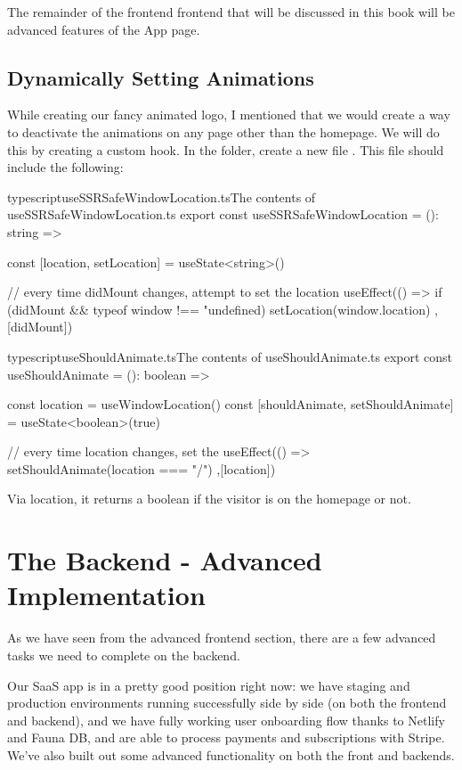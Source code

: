 \documentclass[paper=6in:9in,pagesize=pdftex,headinclude=on,footinclude=on,12pt]{scrbook}
\begin{document}
The remainder of the frontend frontend that will be discussed in this book will be advanced features of the App page. 

\section{Dynamically Setting Animations}

While creating our fancy animated logo, I mentioned that we would create a way to deactivate the animations on any page other than the homepage. We will do this by creating a custom hook. In the  folder, create a new file . This file should include the following:


\begin{codeInput}{typescript}{useSSRSafeWindowLocation.ts}{The contents of useSSRSafeWindowLocation.ts}
export const useSSRSafeWindowLocation = (): string => {
  const [location, setLocation] = useState<string>()

  // every time didMount changes, attempt to set the location
  useEffect(() => {
    if (didMount && typeof window !== "undefined) {
      setLocation(window.location)
    }
  },[didMount])
}
\end{codeInput}

\begin{codeInput}{typescript}{useShouldAnimate.ts}{The contents of useShouldAnimate.ts}
export const useShouldAnimate = (): boolean => {
  const location = useWindowLocation()
  const [shouldAnimate, setShouldAnimate] = useState<boolean>(true)

  // every time location changes, set the
  useEffect(() => {
    setShouldAnimate(location === "/") 
  },[location])
}
\end{codeInput}

Via location, it returns a boolean if the visitor is on the homepage or not.

\chapter{The Backend - Advanced Implementation}

As we have seen from the advanced frontend section, there are a few advanced tasks we need to complete on the backend.


Our SaaS app is in a pretty good position right now: we have staging and production environments running successfully side by side (on both the frontend and backend), and we have fully working user onboarding flow thanks to Netlify and Fauna DB, and are able to process payments and subscriptions with Stripe. We've also built out some advanced functionality on both the front and backends. 
\end{document}
